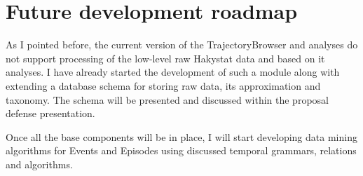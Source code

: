 \section{Future development roadmap}
As I pointed before, the current version of the TrajectoryBrowser and analyses do not support processing of the low-level raw Hakystat data and based on it analyses. I have already started the development of such a module along with extending a database schema for storing raw data, its approximation and taxonomy. The schema will be presented and discussed within the proposal defense presentation.

Once all the base components will be in place, I will start developing data mining algorithms for Events and Episodes using discussed temporal grammars, relations and algorithms.